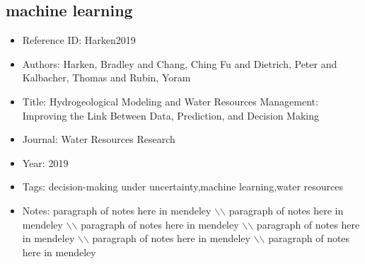 \documentclass[11pt]{article}
\begin{document}
\subsection{machine learning} 
\noindent\citep{Harken2019} 
\begin{itemize} 
\item{Reference ID:  Harken2019} 

\item{Authors:  Harken, Bradley and Chang, Ching Fu and Dietrich, Peter and Kalbacher, Thomas and Rubin, Yoram} 

\item{Title:  Hydrogeological Modeling and Water Resources Management: Improving the Link Between Data, Prediction, and Decision Making} 

\item{Journal:  Water Resources Research} 

\item{Year:  2019} 

\item{Tags:  decision-making under uncertainty,machine learning,water resources} 

\item{Notes:  paragraph of notes here in mendeley $\backslash$$\backslash$ paragraph of notes here in mendeley $\backslash$$\backslash$ paragraph of notes here in mendeley $\backslash$$\backslash$ paragraph of notes here in mendeley $\backslash$$\backslash$ paragraph of notes here in mendeley $\backslash$$\backslash$ paragraph of notes here in mendeley} 

\end{itemize}\medskip
\end{document}
